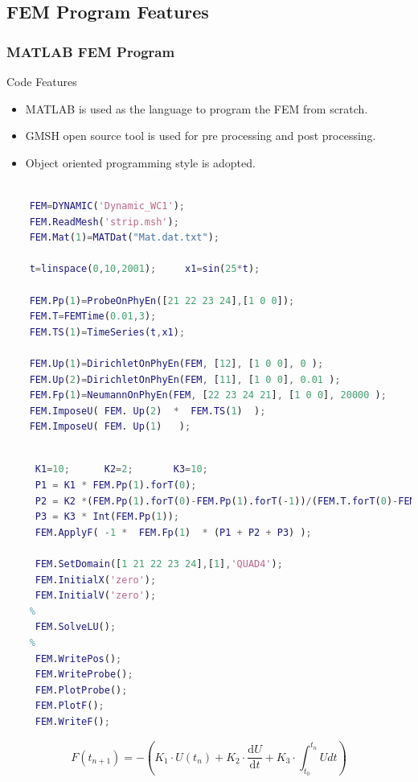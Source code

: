 \documentclass[9pt]{beamer}
\begin{document}
\subsection{FEM Program Features}
\begin{frame}[fragile]\frametitle{MATLAB FEM Program }
\begin{block}{Code Features}
\begin{itemize}
\item MATLAB is used as the language to program the FEM from scratch.
\item GMSH open source tool is used for pre processing and post processing.
\item Object oriented programming style is adopted.
\end{itemize}
\end{block}

\begin{lstlisting}[language=matlab,caption=Example input script]

    FEM=DYNAMIC('Dynamic_WC1');
    FEM.ReadMesh('strip.msh');
    FEM.Mat(1)=MATDat("Mat.dat.txt");

    t=linspace(0,10,2001);     x1=sin(25*t);    

    FEM.Pp(1)=ProbeOnPhyEn([21 22 23 24],[1 0 0]);
    FEM.T=FEMTime(0.01,3);
    FEM.TS(1)=TimeSeries(t,x1);

    FEM.Up(1)=DirichletOnPhyEn(FEM, [12], [1 0 0], 0 );
    FEM.Up(2)=DirichletOnPhyEn(FEM, [11], [1 0 0], 0.01 );
    FEM.Fp(1)=NeumannOnPhyEn(FEM, [22 23 24 21], [1 0 0], 20000 );
    FEM.ImposeU( FEM. Up(2)  *  FEM.TS(1)  );
    FEM.ImposeU( FEM. Up(1)   );
\end{lstlisting}

\end{frame}

\begin{frame}[fragile] 
  \begin{lstlisting}[language=matlab]
  
     K1=10;      K2=2;       K3=10; 
     P1 = K1 * FEM.Pp(1).forT(0);
     P2 = K2 *(FEM.Pp(1).forT(0)-FEM.Pp(1).forT(-1))/(FEM.T.forT(0)-FEM.T.forT(-1));
     P3 = K3 * Int(FEM.Pp(1));
     FEM.ApplyF( -1 *  FEM.Fp(1)  * (P1 + P2 + P3) );
    
     FEM.SetDomain([1 21 22 23 24],[1],'QUAD4'); 
     FEM.InitialX('zero');
     FEM.InitialV('zero');
    % 
     FEM.SolveLU();
    % 
     FEM.WritePos();
     FEM.WriteProbe();
     FEM.PlotProbe();
     FEM.PlotF();
     FEM.WriteF();

\end{lstlisting}

\begin{equation*}
F(t_{n+1})=-(K_1 \cdot U(t_{n})+K_2\cdot\frac{\text{d}U}{\text{d}t}+K_3\cdot\int_{t_0}^{t_n} U dt)
\end{equation*}
\end{frame}
\end{document}
